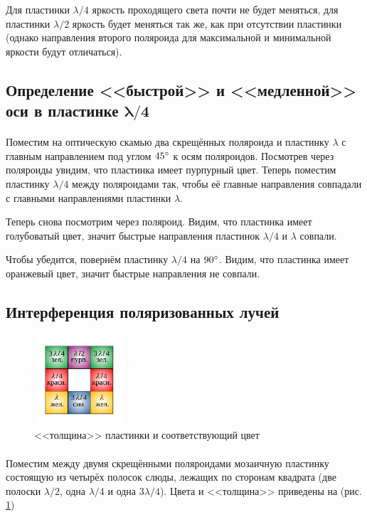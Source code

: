 \documentclass[a4paper,12pt]{article} %
\begin{document}
Для пластинки $\lambda/4$ яркость проходящего света почти не будет меняться, для пластинки $\lambda/2$ яркость будет меняться так же, как при отсутствии пластинки (однако направления второго поляроида для максимальной и минимальной яркости будут отличаться).

\subsection{Определение <<быстрой>> и <<медленной>> оси в пластинке $\boldsymbol\lambda / \mathbf{4}$}

\paragraph{} Поместим на оптическую скамью два скрещённых поляроида и пластинку $\lambda$ с главным направлением под углом $45\degree$ к осям поляроидов. Посмотрев через поляроиды увидим, что пластинка имеет пурпурный цвет. Теперь поместим пластинку $\lambda / 4$ между поляроидами так, чтобы её главные направления совпадали с главными направлениями пластинки $\lambda$.

Теперь снова посмотрим через поляроид. Видим, что пластинка имеет голубоватый цвет, значит быстрые направления пластинок $\lambda/4$ и $\lambda$ совпали.

Чтобы убедится, повернём пластинку  $\lambda/4$ на $90\degree$. Видим, что пластинка имеет оранжевый цвет, значит быстрые направления не совпали.

\subsection{Интерференция поляризованных лучей}

\begin{figure}[h]
\center
\includegraphics[width=0.3\textwidth]{plast.pdf}
\caption{<<толщина>> пластинки и соответствующий цвет}
\label{fig:plast}
\end{figure}

\paragraph{} Поместим между двумя скрещёнными поляроидами мозаичную пластинку состоящую из четырёх полосок слюды, лежащих по сторонам квадрата (две полоски $\lambda/2$, одна $\lambda/4$ и одна $3\lambda/4$).  Цвета и <<толщина>> приведены на (рис. \ref{fig:plast})
\end{document}
